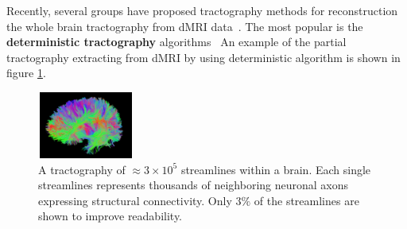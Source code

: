 Recently, several groups have proposed tractography methods for reconstruction the whole brain tractography from dMRI data~\cite{zhang2008identifying}. The most popular is the \textbf{deterministic tractography} algorithms~\cite{mori2002fiber}
An example of the partial tractography extracting from dMRI by using deterministic algorithm is shown in figure \ref{fig:tractography}.
\begin{figure}
  \centering
  \includegraphics[width=3.18cm, height=2.2cm ]{figures/tractography.png}
  \caption{A tractography of $\approx 3\times 10^5$ streamlines within a brain. 
	Each single streamlines represents thousands of neighboring neuronal axons expressing structural connectivity.
	Only $3\%$ of the streamlines are shown to improve readability. 
	}
  \label{fig:tractography}
\end{figure}
